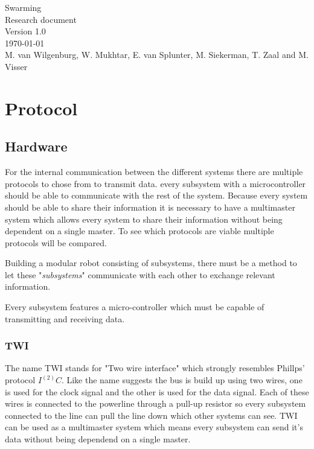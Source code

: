 \documentclass[10pt,a4paper]{article}
\begin{document}
\begin{titlepage}
    \centering
    \vfill
    {\Large

    Swarming\\

   
    {\small Research document}\\
    {\small Version 1.0}\\
    {\small \today}\\
        
        \vskip2cm
        {\small M. van Wilgenburg, W. Mukhtar, E. van Splunter, M. Siekerman, T. Zaal and M. Visser}\\
    }    
    \vfill
    
    \vfill
    \vfill
\end{titlepage}

\newpage

\listoffigures
\newpage

\listoftables
\newpage

\tableofcontents
\newpage


\section{Protocol}
\subsection{Hardware}

For the internal communication between the different systems there are multiple protocols to chose from to transmit data. every subsystem with a microcontroller should be able to communicate with the rest of the system. Because every system should be able to share their information it is necessary to have a multimaster system which allows every system to share their information without being dependent on a single master. To see which protocols are viable multiple protocols will be compared.

Building a modular robot consisting of subsystems, there must be a method to let these "\textit{subsystems}" communicate with each other to exchange relevant information. 

Every subsystem features a micro-controller which must be capable of transmitting and receiving data.  

\subsubsection{TWI}
The name TWI stands for "Two wire interface" which strongly resembles Phillps' protocol $I^(2)C$. Like the name suggests the bus is build up using two wires, one is used for the clock signal and the other is used for the data signal. Each of these wires is connected to the powerline through a pull-up resistor so every subsystem connected to the line can pull the line down which other systems can see. TWI can be used as a multimaster system which means every subsystem can send it's data without being dependend on a single master.
\end{document}
